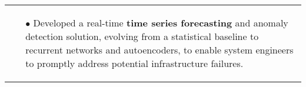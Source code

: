 \documentclass[11pt,a4paper,sans,english]{moderncv}
\makeatletter
\newcommand*{\mycvitem}[2][.25em]{%
	\vspace{-.25em}
	\begin{tabular}{@{}p{\textwidth}@{}}%
		\small#2%
	\end{tabular}%
	\par\addvspace{-0.7em}  %
}
\newcommand*{\cvtag}[1]{%
	\textcolor{lightgray!50!black}{\fbox{\mathstrut\scriptsize\textsf{\textbf{#1}}}}%
}
\makeatother
\begin{document}
\mycvitem{
\vspace*{-.6cm}
\begin{flushleft}
	\noindent
	\cvtag{Python} \cvtag{Tensorflow} \cvtag{Google Cloud Platform} \cvtag{Flask} \cvtag{Bokeh} \cvtag{Bash}
\end{flushleft}
\vspace*{-.2cm}
\begin{itemize}
	\item[$\bullet$] Developed a real-time \textbf{time series forecasting} and anomaly detection solution, evolving from a statistical baseline to recurrent networks and autoencoders, to enable system engineers to promptly address potential infrastructure failures.
\end{itemize}}

\end{document}
